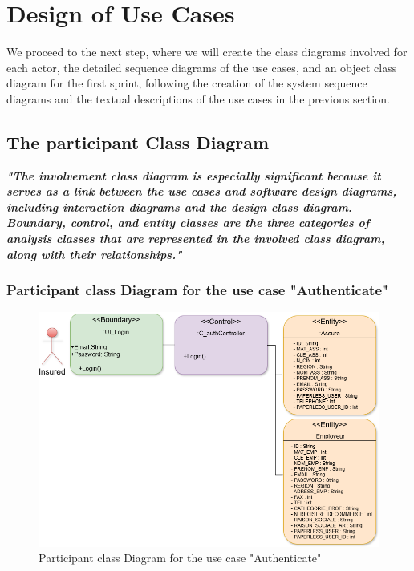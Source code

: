 \section{Design of Use Cases}
 We proceed to the next step, where we will create the class diagrams involved for each actor, the detailed sequence diagrams of the use cases, and an object class diagram for the first sprint, following the creation of the system sequence diagrams and the textual descriptions of the use cases in the previous section.
 \subsection{The participant Class Diagram}
 \textbf{\textit{"The involvement class diagram is especially significant because it serves as a link between the use cases and software design diagrams, including interaction diagrams and the design class diagram.  Boundary, control, and entity classes are the three categories of analysis classes that are represented in the involved class diagram, along with their relationships."}}\cite{samplewebs6}
 \subsubsection{Participant class Diagram for the use case "Authenticate"}
 \begin{figure}[h!]
    \centering
    \includegraphics[width=1\textwidth]{figures/dc auth.png}
    \caption{Participant class Diagram for the use case "Authenticate"}
\end{figure}

